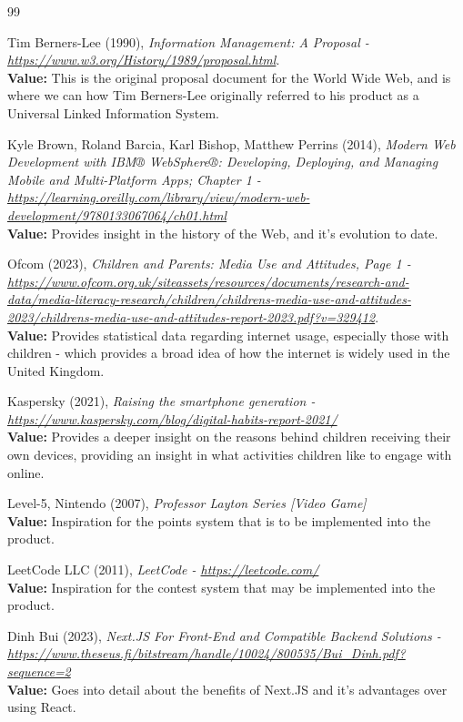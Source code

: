 \documentclass[]{final_report}
\begin{document}
\newpage
\begin{thebibliography}{99}
 Tim Berners-Lee (1990),
\emph{Information Management: A Proposal - \url{https://www.w3.org/History/1989/proposal.html}}.\\
\textbf{Value:} This is the original proposal document for the World Wide Web, and is where we can how Tim Berners-Lee originally referred to his product as a Universal Linked Information System.

 Kyle Brown, Roland Barcia, Karl Bishop, Matthew Perrins (2014),
\emph{Modern Web Development with IBM® WebSphere®: Developing, Deploying, and Managing Mobile and Multi-Platform Apps; Chapter 1 - \url{https://learning.oreilly.com/library/view/modern-web-development/9780133067064/ch01.html}}\\
\textbf{Value:} Provides insight in the history of the Web, and it's evolution to date.

 Ofcom (2023),
\emph{Children and Parents: Media Use and Attitudes, Page 1 - \url{https://www.ofcom.org.uk/siteassets/resources/documents/research-and-data/media-literacy-research/children/childrens-media-use-and-attitudes-2023/childrens-media-use-and-attitudes-report-2023.pdf?v=329412}}.\\
\textbf{Value:} Provides statistical data regarding internet usage, especially those with children - which provides a broad idea of how the internet is widely used in the United Kingdom.

 Kaspersky (2021),
\emph{Raising the smartphone generation - \url{https://www.kaspersky.com/blog/digital-habits-report-2021/}}\\
\textbf{Value:} Provides a deeper insight on the reasons behind children receiving their own devices, providing an insight in what activities children like to engage with online.

 Level-5, Nintendo (2007),
\emph{ Professor Layton Series [Video Game]}\\
\textbf{Value:} Inspiration for the points system that is to be implemented into the product.

 LeetCode LLC (2011),
\emph{LeetCode - \url{https://leetcode.com/}}\\
\textbf{Value:} Inspiration for the contest system that may be implemented into the product.

 Dinh Bui (2023),
\emph{Next.JS For Front-End and Compatible Backend Solutions - \url{https://www.theseus.fi/bitstream/handle/10024/800535/Bui_Dinh.pdf?sequence=2}}\\
\textbf{Value:} Goes into detail about the benefits of Next.JS and it's advantages over using React.


\end{thebibliography}
\end{document}
